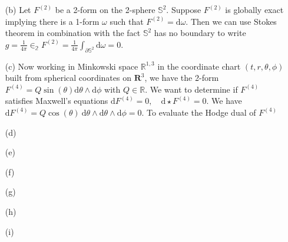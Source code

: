 \documentclass[10pt, a4paper]{article}
\begin{document}
{\begin{enumerate}
  \textbf{Counterexample:} Consider the circle smooth manifold $\mathbb{S}^1 \subset \mathbb{R}^2$ (embeded as $\{x^2 + y^2 = 1|(x, y)\in\mathbb{R}^2\}$ for simplicity). It takes at least two charts to cover this manifold and, although on individual charts all closed 1-forms are exact (charts make the manifold look like $\mathbb{R}$ locally), this property is lost globally. Choose the chart map $\theta = \arctan_2$ sending points $(x, y)$ on the circle to their angle with the $x$ axis excluding the point $(1, 0)$ so that the domain is open. With this chart we have the coordinate induced one form frame field $\text{d}\theta$ which we use to construct the closed form $\omega = \text{d}\theta$. On $(0, 2\pi)$, this form is exact since we have a $0$-form $\lambda =  F \in C^{\infty}((0, 2\pi))$ such that $\omega = \text{d}\lambda = \partial_\theta F \text{d}\theta = \text{d}\theta$ forcing $F = \theta + c$, $c \in \mathbb{R}$ since $F$ has to be a primitive of $1$ in the variable $\theta$. The function $F$ is smooth on the chart, but can never be extended to s smooth function over $\mathbb{S}^1$ globally. Indeed, $0$ and $2\pi$ being identified, a continuous function on $\mathbb{S}^1$ should be consistant at the excluded point $(0, 1)$ and this would requiere  $\lim_{\theta \to 0+} (\theta + c) = \lim_{\theta \to 2\pi^-} (\theta + c)$ which is impossible. Therefore there is a closed form on $\mathbb{S}^1$ that is not exact. 
  \item[(b)] Let $F^{(2)}$ be a 2-form on the 2-sphere $\mathbb{S}^2$. Suppose $F^{(2)}$ is globally exact implying there is a 1-form $\omega$ such that $F^{(2)} = \text{d}\omega$. Then we can use Stokes theorem in combination with the fact $\mathbb{S}^2$ has no boundary to write $g= \frac{1}{4\pi} \in_{\mathbb{2}} F^{(2)} = \frac{1}{4\pi} \int_{\partial \mathbb{S}^2} \text{d}\omega = 0$. 
  \item[(c)] Now working in Minkowski space $\mathbb{R}^{1, 3}$ in the coordinate chart $(t, r, \theta, \phi)$ built from spherical coordinates on $\mathbf{R}^3$, we have the 2-form $F^{(4)} = Q \sin(\theta) \text{d}\theta \wedge \text{d}\phi$ with $Q\in \mathbb{R}$. We want to determine if $F^{(4)}$ satisfies Maxwell's equations $\text{d} F^{(4)}=0, \quad \text{d} \star F^{(4)}=0$. We have $\text{d} F^{(4)} =  Q \cos(\theta) \ \text{d}\theta \wedge \text{d}\theta \wedge \text{d}\phi = 0$. To evaluate the Hodge dual of $F^{(4)}$ 
  \item[(d)] 
  \item[(e)]
  \item[(f)]
  \item[(g)]
  \item[(h)]
  \item[(i)] 


\end{enumerate}}
\end{document}
